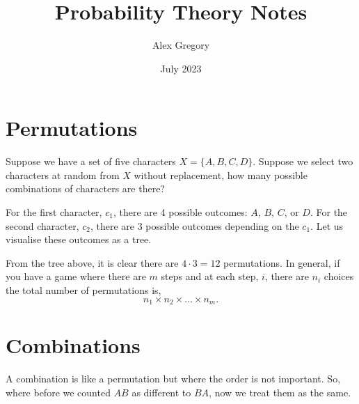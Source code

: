\documentclass{article}
\title{Probability Theory Notes}
\author{Alex Gregory}
\date{July 2023}
\begin{document}
\maketitle

\section{Permutations}

Suppose we have a set of five characters $X = \{ A, B, C, D \}$. Suppose we select two characters at random from $X$ without replacement, how many possible combinations of characters are there?

For the first character, $c_1$, there are 4 possible outcomes: $A$, $B$, $C$, or $D$. For the second character, $c_2$, there are 3 possible outcomes depending on the $c_1$. Let us visualise these outcomes as a tree.


From the tree above, it is clear there are $4 \cdot 3 = 12$ permutations. In general, if you have a game where there are $m$ steps and at each step, $i$, there are $n_i$ choices the total number of permutations is,
$$
    n_1 \times n_2 \times \dots \times n_m.
$$

\section{Combinations}

A combination is like a permutation but where the order is not important. So, where before we counted $AB$ as different to $BA$, now we treat them as the same.
\end{document}
